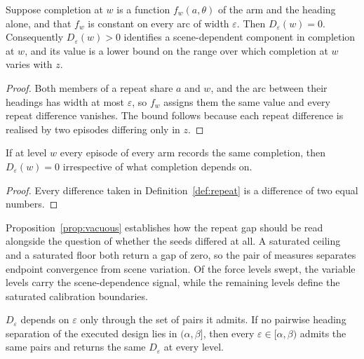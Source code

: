 \begin{proposition}\label{prop:repeat}
Suppose completion at $w$ is a function $f_w(a,\theta)$ of the arm and the
heading alone, and that $f_w$ is constant on every arc of width $\varepsilon$.
Then $D_\varepsilon(w) = 0$. Consequently $D_\varepsilon(w) > 0$ identifies a
scene-dependent component in completion at $w$, and its value is a lower bound on
the range over which completion at $w$ varies with $z$.
\end{proposition}

\begin{proof}
Both members of a repeat share $a$ and $w$, and the arc between their headings
has width at most $\varepsilon$, so $f_w$ assigns them the same value and every
repeat difference vanishes. The bound follows because each repeat difference is
realised by two episodes differing only in $z$.
\end{proof}

\begin{proposition}\label{prop:vacuous}
If at level $w$ every episode of every arm records the same completion, then
$D_\varepsilon(w) = 0$ irrespective of what completion depends on.
\end{proposition}

\begin{proof}
Every difference taken in Definition~\ref{def:repeat} is a difference of two
equal numbers.
\end{proof}

Proposition~\ref{prop:vacuous} establishes how the repeat gap should be read
alongside the question of whether the seeds differed at all. A saturated ceiling
and a saturated floor both return a gap of zero, so the pair of measures separates
endpoint convergence from scene variation. Of the \NWindLevels{} force levels
swept, the \NInformativeLevels{} variable levels carry the scene-dependence signal,
while the remaining levels define the saturated calibration boundaries.

\begin{proposition}\label{prop:tol}
$D_\varepsilon$ depends on $\varepsilon$ only through the set of pairs it
admits. If no pairwise heading separation of the executed design lies in
$(\alpha,\beta]$, then every $\varepsilon \in [\alpha,\beta)$ admits the same
pairs and returns the same $D_\varepsilon$ at every level.
\end{proposition}

